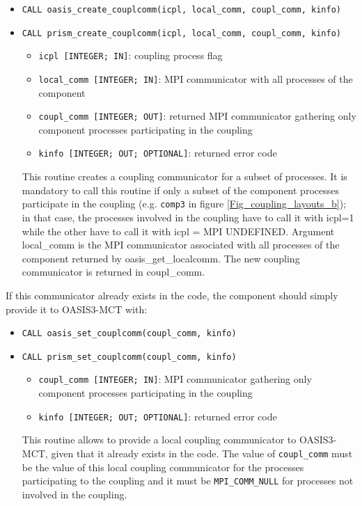 \begin{itemize}
\item {\tt CALL oasis\_create\_couplcomm(icpl, local\_comm,
    coupl\_comm, kinfo)}
\item {\tt CALL prism\_create\_couplcomm(icpl, local\_comm,
    coupl\_comm, kinfo)}
  \begin{itemize}
  \item {\tt icpl [INTEGER; IN]}: coupling process flag
  \item {\tt local\_comm [INTEGER; IN]}: MPI communicator with all
    processes of the component
  \item {\tt coupl\_comm [INTEGER; OUT]}: returned MPI communicator
    gathering only component processes participating in the coupling
  \item {\tt kinfo [INTEGER; OUT; OPTIONAL]}: returned error code
  \end{itemize}

  This routine creates a coupling communicator for a subset of
  processes. It is mandatory to call this routine if only a subset of
  the component processes participate in the coupling (e.g. {\tt comp3} in figure
    \ref{Fig_coupling_layouts_b}); in that case, the processes
    involved in the coupling have to call it with icpl=1 while the
    other have to call it with icpl = MPI UNDEFINED. Argument
    local\_comm is the MPI communicator associated with all processes
    of the component returned by oasis\_get\_localcomm. The new coupling 
    communicator is returned in coupl\_comm.

\end{itemize}
If this communicator already exists in the code, the component should
simply provide it to OASIS3-MCT with:

\begin{itemize}
\item {\tt CALL oasis\_set\_couplcomm(coupl\_comm, kinfo)}
\item {\tt CALL prism\_set\_couplcomm(coupl\_comm, kinfo)}
  \begin{itemize}
  \item {\tt coupl\_comm [INTEGER; IN]}: MPI communicator gathering
    only component processes participating in the coupling
  \item {\tt kinfo [INTEGER; OUT; OPTIONAL]}: returned error code
  \end{itemize}

  This routine allows to provide a local coupling communicator to
  OASIS3-MCT, given that it already exists in the code. The value of
  {\tt coupl\_comm} must be the value of this local coupling
  communicator for the processes participating to the coupling and it
  must be {\tt MPI\_COMM\_NULL} for processes not involved in the
  coupling.
\end{itemize}

